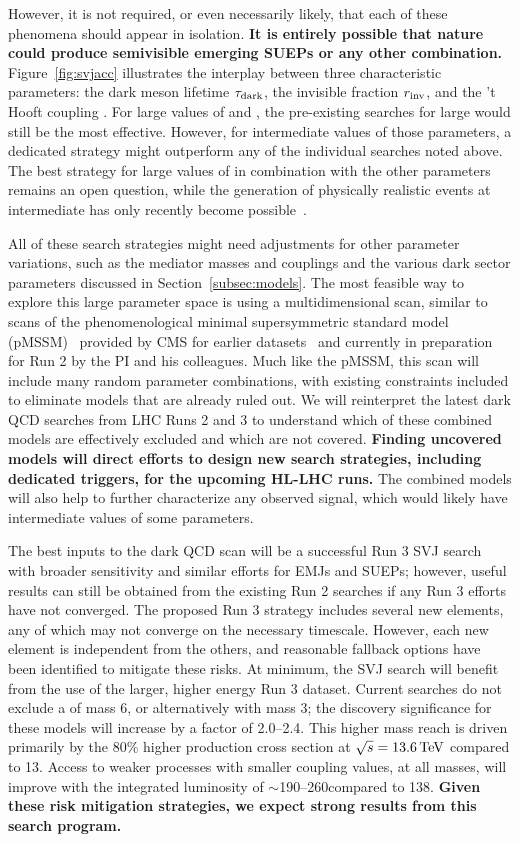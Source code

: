 However, it is not required, or even necessarily likely, that each of these phenomena should appear in isolation.
\textbf{It is entirely possible that nature could produce semivisible emerging SUEPs or any other combination.}
Figure~\ref{fig:svjacc} illustrates the interplay between three characteristic parameters:
the dark meson lifetime $\tau_\text{dark}$, the invisible fraction $r_{\mathrm{inv}}$, and the 't Hooft coupling \thooft.
For large values of \rinv and \taudark, the pre-existing searches for large \met would still be the most effective.
However, for intermediate values of those parameters, a dedicated strategy might outperform any of the individual searches noted above.
The best strategy for large values of \thooft in combination with the other parameters remains an open question,
while the generation of physically realistic events at intermediate \thooft has only recently become possible~\cite{Cesarotti:2020uod}.

All of these search strategies might need adjustments for other parameter variations,
such as the mediator masses and couplings and the various dark sector parameters discussed in Section~\ref{subsec:models}.
The most feasible way to explore this large parameter space is using a multidimensional scan,
similar to scans of the phenomenological minimal supersymmetric standard model (pMSSM)~\cite{Djouadi:1998di}
provided by CMS for earlier datasets~\cite{Khachatryan:2016nvf,SUS-16-033-supp} and currently in preparation for Run 2 by the PI and his colleagues.
Much like the pMSSM, this scan will include many random parameter combinations, with existing constraints included to eliminate models that are already ruled out.
We will reinterpret the latest dark QCD searches from LHC Runs 2 and 3 to understand which of these combined models are effectively excluded and which are not covered.
\textbf{Finding uncovered models will direct efforts to design new search strategies, including dedicated triggers, for the upcoming HL-LHC runs.}
The combined models will also help to further characterize any observed signal, which would likely have intermediate values of some parameters.

The best inputs to the dark QCD scan will be a successful Run 3 SVJ search with broader sensitivity and similar efforts for EMJs and SUEPs;
however, useful results can still be obtained from the existing Run 2 searches if any Run 3 efforts have not converged.
The proposed Run 3 strategy includes several new elements, any of which may not converge on the necessary timescale.
However, each new element is independent from the others, and reasonable fallback options have been identified to mitigate these risks.
At minimum, the SVJ search will benefit from the use of the larger, higher energy Run 3 dataset.
Current searches do not exclude a \PZprime of mass 6\TeV, or alternatively \Pbifun with mass 3\TeV;
the discovery significance for these models will increase by a factor of 2.0--2.4.
This higher mass reach is driven primarily by the 80\% higher production cross section at $\sqrt{s}=13.6\,\text{Te\hspace{-.08em}V}$ compared to 13\TeV.
Access to weaker processes with smaller coupling values, at all masses, will improve with the integrated luminosity of ${\sim}$190--260\fbinv compared to 138\fbinv.
\textbf{Given these risk mitigation strategies, we expect strong results from this search program.}
